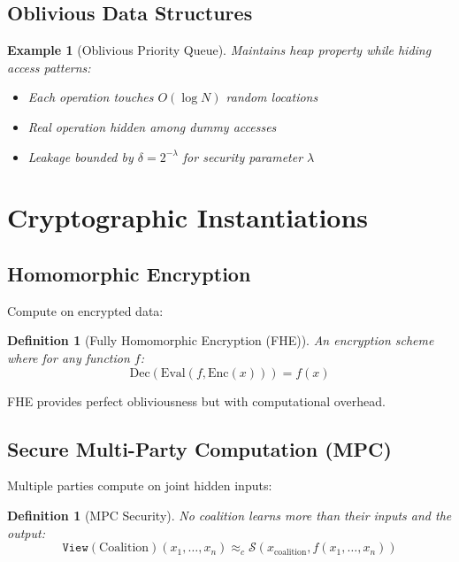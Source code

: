 \documentclass[11pt,final,hidelinks]{article}
\newtheorem{definition}[theorem]{Definition}
\newtheorem{example}[theorem]{Example}
\newcommand{\Simulator}{\mathcal{S}}
\newcommand{\View}[1]{\mathtt{View}(#1)}
\begin{document}
\subsection{Oblivious Data Structures}

\begin{example}[Oblivious Priority Queue]
Maintains heap property while hiding access patterns:
\begin{itemize}
    \item Each operation touches $O(\log N)$ random locations
    \item Real operation hidden among dummy accesses
    \item Leakage bounded by $\delta = 2^{-\lambda}$ for security parameter $\lambda$
\end{itemize}
\end{example}

\section{Cryptographic Instantiations}

\subsection{Homomorphic Encryption}

Compute on encrypted data:

\begin{definition}[Fully Homomorphic Encryption (FHE)]
An encryption scheme where for any function $f$:
\begin{equation}
\text{Dec}(\text{Eval}(f, \text{Enc}(x))) = f(x)
\end{equation}
\end{definition}

FHE provides perfect obliviousness but with computational overhead.

\subsection{Secure Multi-Party Computation (MPC)}

Multiple parties compute on joint hidden inputs:

\begin{definition}[MPC Security]
No coalition learns more than their inputs and the output:
\begin{equation}
\View{\text{Coalition}}(x_1, \ldots, x_n) \approx_c \Simulator(x_{\text{coalition}}, f(x_1, \ldots, x_n))
\end{equation}
\end{definition}
\end{document}
